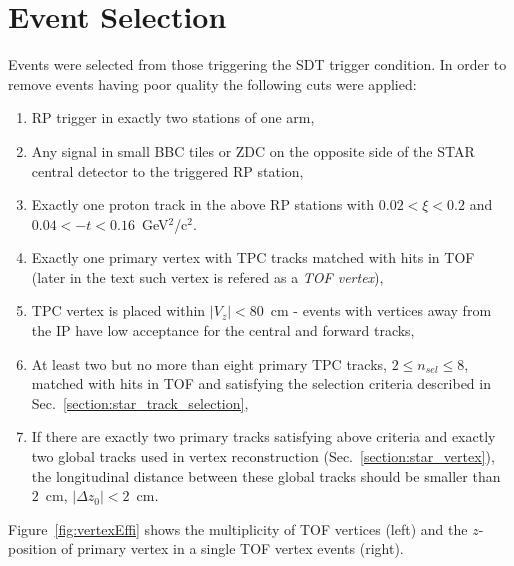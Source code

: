 \section{Event Selection}\label{section:star_event_selection}
Events were selected from those triggering the SDT trigger condition. In order to remove events having poor quality the following cuts were applied:
\begin{enumerate}
	\item RP trigger in exactly two stations of one arm,
	\item Any signal in small BBC tiles or ZDC on the opposite side of the STAR central detector to the triggered RP station,
	\item Exactly one proton track in the above RP stations with $0.02 < \xi < 0.2$ and $0.04 < -t < 0.16$~GeV$^{2}$/c$^{2}$. 
	\item Exactly one primary vertex with TPC tracks matched with hits in TOF (later in the text such vertex  is refered as a \textit{TOF vertex}),
	\item TPC vertex is placed within $|V_z|<80$~cm - events with vertices away from the IP have low acceptance for the central and forward tracks,
	\item At least two but no more than eight primary TPC tracks, $2\leq n_{sel}\leq 8$, matched with hits in TOF and satisfying the selection criteria described in Sec.~\ref{section:star_track_selection},
	\item If there are exactly two primary tracks satisfying above criteria and exactly two global tracks used in vertex reconstruction (Sec.~\ref{section:star_vertex}), the longitudinal distance between these global tracks should be smaller than $2$~cm, $|\Delta z_0|<2$~cm.
\end{enumerate}
Figure~\ref{fig:vertexEffi} shows the multiplicity of TOF vertices (left) and the $z$-position of primary vertex in a single TOF vertex events (right). 
